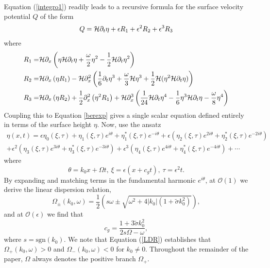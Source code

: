 \documentclass{JFM_Style/jfm}
\begin{document}
Equation (\ref{integro1}) readily leads to a recursive formula for the surface velocity potential $Q$ of the form 
\begin{equation}
Q = \mathcal{H}\partial_{t}\eta + \epsilon R_{1} + \epsilon^{2} R_{2} + \epsilon^{3} R_{3}
\label{Qexp}
\end{equation}
where
\begin{align*}
R_{1}= & \mathcal{H}\partial_{x}\left(\eta\mathcal{H}\partial_{t}\eta+ \frac{\omega}{2}\eta^{2} - \frac{1}{2}\mathcal{H}\partial_{t}\eta^{2} \right)\\
R_{2}= & \mathcal{H}\partial_{x}\left(\eta R_{1} \right) - \mathcal{H}\partial_{x}^{2}\left(\frac{1}{6}\partial_{t}\eta^{3} + \frac{\omega}{3}\mathcal{H}\eta^{3} + \frac{1}{2}\mathcal{H}(\eta^{2}\mathcal{H}\partial_{t}\eta)\right)\\
R_{3} = & \mathcal{H}\partial_{x}\left(\eta R_{2} \right) + \frac{1}{2}\partial_{x}^{2}\left(\eta^{2}R_{1}\right) + \mathcal{H}\partial_{x}^{3}\left(\frac{1}{24}\mathcal{H}\partial_{t}\eta^{4} - \frac{1}{6}\eta^{3}\mathcal{H}\partial_{t}\eta - \frac{\omega}{8}\eta^{4}\right)  
\end{align*}
Coupling this to Equation \eqref{berexp} gives a single scalar equation defined entirely in terms of the surface height $\eta$.  Now, use the ansatz
\begin{multline}
\eta(x,t) = \epsilon \eta_{0}(\xi,\tau) + \eta_{1}(\xi,\tau)e^{i\theta} +  \eta_{1}^{\ast}(\xi,\tau)e^{-i\theta} + \epsilon\left(\eta_{2}(\xi,\tau)e^{2i\theta} +  \eta_{2}^{\ast}(\xi,\tau)e^{-2i\theta}\right) \\
+ \epsilon^{2}\left(\eta_{3}(\xi,\tau)e^{3i\theta} +  \eta_{3}^{\ast}(\xi,\tau)e^{-3i\theta}\right)  + \epsilon^{3}\left(\eta_{4}(\xi,\tau)e^{4i\theta} +  \eta_{4}^{\ast}(\xi,\tau)e^{-4i\theta}\right) + \cdots
\label{nlssurfexp}
\end{multline}
where
\[
\theta = k_{0}x + \Omega t, ~ \xi = \epsilon(x + c_{g}t), ~ \tau = \epsilon^{2}t.
\]
By expanding and matching terms in the fundamental harmonic $e^{i\theta}$, at $\mathcal{O}(1)$ we derive the linear dispersion relation,
\begin{equation}
\Omega_{\pm}(k_{0},\omega)  = \frac{1}{2}\left(s\omega \pm \sqrt{\omega^{2} + 4|k_{0}|(1+\tilde{\sigma}k_{0}^{2})}\right),
\label{LDR}
\end{equation}
and at $\mathcal{O}(\epsilon)$ we find that 
\[
c_{g} = \frac{1+3\tilde{\sigma}k_{0}^{2}}{2s\Omega - \omega},
\]
where $s=\mbox{sgn}(k_{0})$.  We note that Equation (\ref{LDR}) establishes that $\Omega_{+}(k_{0},\omega) > 0$ and $\Omega_{-}(k_{0},\omega) < 0$ for $k_{0}\neq0$.  Throughout the remainder of the paper, $\Omega$ always denotes the positive branch $\Omega_{+}$.  
\end{document}
